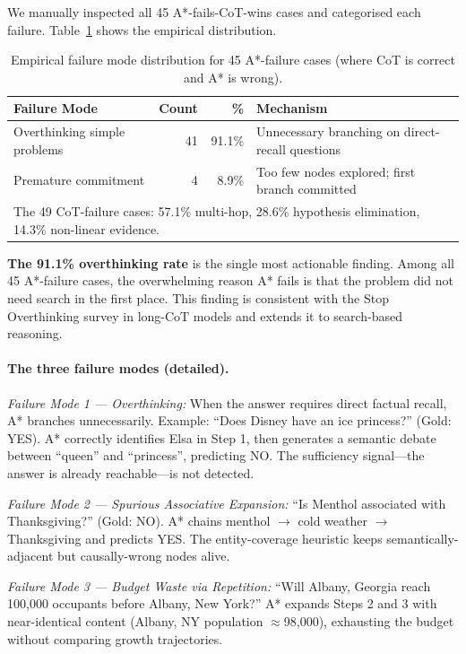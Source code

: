 \documentclass[11pt]{article}
\begin{document}
We manually inspected all 45 A*-fails-CoT-wins cases and categorised each failure. Table~\ref{tab:failure_dist} shows the empirical distribution.

\begin{table}[t]
\centering
\caption{Empirical failure mode distribution for 45 A*-failure cases (where CoT is correct and A* is wrong).}
\label{tab:failure_dist}
\small
\begin{tabular}{lrrl}
\toprule
\textbf{Failure Mode} & \textbf{Count} & \textbf{\%} & \textbf{Mechanism} \\
\midrule
Overthinking simple problems   & 41 & 91.1\% & Unnecessary branching on direct-recall questions \\
Premature commitment           &  4 &  8.9\% & Too few nodes explored; first branch committed \\
\bottomrule
\multicolumn{4}{l}{\small The 49 CoT-failure cases: 57.1\% multi-hop, 28.6\% hypothesis elimination, 14.3\% non-linear evidence.}
\end{tabular}
\end{table}

\textbf{The 91.1\% overthinking rate} is the single most actionable finding. Among all 45 A*-failure cases, the overwhelming reason A* fails is that the problem did not need search in the first place. This finding is consistent with the Stop Overthinking survey \citep{zhang2025overthinking} in long-CoT models and extends it to search-based reasoning.

\paragraph{The three failure modes (detailed).}

\textit{Failure Mode 1 — Overthinking:} When the answer requires direct factual recall, A* branches unnecessarily. Example: ``Does Disney have an ice princess?'' (Gold: YES). A* correctly identifies Elsa in Step 1, then generates a semantic debate between ``queen'' and ``princess'', predicting NO. The sufficiency signal—the answer is already reachable—is not detected.

\textit{Failure Mode 2 — Spurious Associative Expansion:} ``Is Menthol associated with Thanksgiving?'' (Gold: NO). A* chains menthol $\to$ cold weather $\to$ Thanksgiving and predicts YES. The entity-coverage heuristic keeps semantically-adjacent but causally-wrong nodes alive.

\textit{Failure Mode 3 — Budget Waste via Repetition:} ``Will Albany, Georgia reach 100,000 occupants before Albany, New York?'' A* expands Steps 2 and 3 with near-identical content (Albany, NY population $\approx$98,000), exhausting the budget without comparing growth trajectories.
\end{document}
